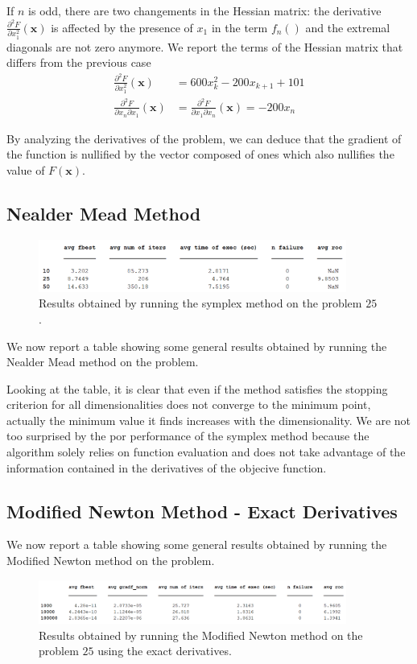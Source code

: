 If $n$ is odd, there are two changements in the Hessian matrix: the derivative $\frac{\partial^2 F}{\partial x_1^2} (\mathbf{x}) $ is affected by the presence of $x_1$ in the term $f_n()$ and the extremal diagonals are not zero anymore. We report the terms of the Hessian matrix that differs from the previous case
\begin{align*}
    \frac{\partial^2 F}{\partial x_1^2}  (\mathbf{x}) &= 600x_k^2 - 200x_{k+1} + 101 \\
    \frac{\partial^2 F}{\partial x_n \partial x_1} (\mathbf{x}) &= \frac{\partial^2 F}{\partial x_1 \partial x_n} (\mathbf{x}) = -200x_n
\end{align*}


By analyzing the derivatives of the problem, we can deduce that the gradient of the function is nullified by the vector composed of ones which also nullifies the value of $F(\mathbf{x})$. 


 
\medskip
\subsection*{Nealder Mead Method}
\begin{figure}[htbp]
    \centering
    \includegraphics[width = 0.9\textwidth]{img/pb25_SX_table.png}
    \caption{Results obtained by running the symplex method on the problem $25$.}
\end{figure}
We now report a table showing some general results obtained by running the Nealder Mead method on the problem.

Looking at the table, it is clear that even if the method satisfies the stopping criterion for all dimensionalities does not converge to the minimum point, actually the minimum value it finds increases with the dimensionality.
We are not too surprised by the por performance of the symplex method because the algorithm solely relies on function evaluation and does not take advantage of the information contained in the derivatives of the objecive function.


\medskip
\subsection*{Modified Newton Method - Exact Derivatives}
We now report a table showing some general results obtained by running the Modified Newton method on the problem.
\begin{figure}[htbp]
    \centering
    \includegraphics[width = 0.9\textwidth]{img/pb25_MN_table.png}
    \caption{Results obtained by running the Modified Newton method on the problem $25$ using the exact derivatives.}
\end{figure}

